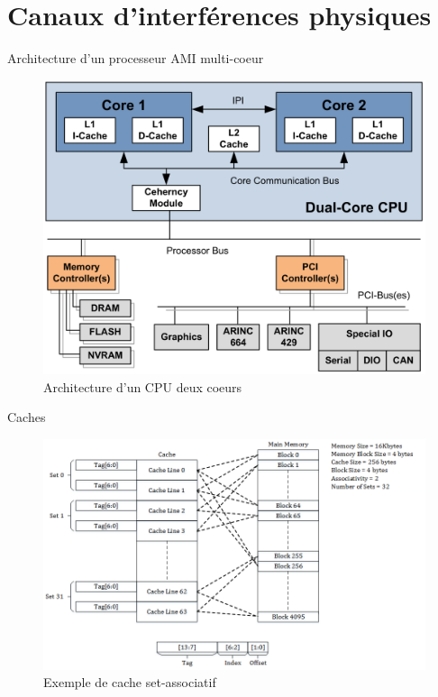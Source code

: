 \documentclass{beamer}
\begin{document}
\section[CI physiques]{Canaux d'interférences physiques}

\begin{frame}{Architecture d'un processeur AMI multi-coeur}
	\begin{figure}
		\centering
		\includegraphics[width=0.7\linewidth]{arch.png}
		\caption{Architecture d'un CPU deux coeurs \cite{Fuch}}
		\label{fig:arch}
	\end{figure}	
\end{frame}

\begin{frame}{Caches}

			\begin{figure}
				\centering
				\includegraphics[width=\linewidth]{Set-Associative_Cache_Snehal_Img.png}
				\caption{Exemple de cache set-associatif \cite{wiki:Cache_placement_policies}}
				\label{fig:Set-Asso}
			\end{figure}
\end{frame}
\end{document}
